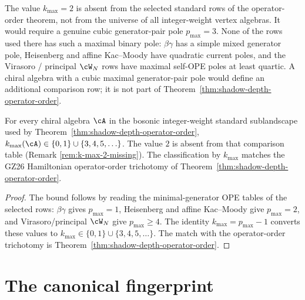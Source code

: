 \begin{remark}[Why $k_{\max} = 2$ is missing]
\label{rem:k-max-2-missing}
The value $k_{\max}=2$ is absent from the selected standard rows of
the operator-order theorem, not from the universe of all integer-weight
vertex algebras. It would require a genuine cubic generator-pair pole
$p_{\max}=3$. None of the rows used there has such a maximal binary
pole: $\beta\gamma$ has a simple mixed generator pole, Heisenberg and
affine Kac--Moody have quadratic current poles, and the Virasoro /
principal $\cW_N$ rows have maximal self-OPE poles at least quartic.
A chiral algebra with a cubic maximal generator-pair pole would define
an additional comparison row; it is not part of
Theorem~\ref{thm:shadow-depth-operator-order}.
\end{remark}

\begin{theorem}
\label{thm:k-max-trichotomy}
For every chiral algebra $\cA$ in the bosonic integer-weight standard
sublandscape used by Theorem~\textup{\ref{thm:shadow-depth-operator-order}},
$k_{\max}(\cA)\in\{0,1\}\cup\{3,4,5,\ldots\}$. The value $2$ is
absent from that comparison table \textup{(}Remark
\textup{\ref{rem:k-max-2-missing})}. The classification by
$k_{\max}$ matches the GZ\textup{26} Hamiltonian operator-order
trichotomy of
Theorem~\textup{\ref{thm:shadow-depth-operator-order}}.
\end{theorem}

\begin{proof}
The bound follows by reading the minimal-generator OPE tables of the
selected rows: $\beta\gamma$ gives $p_{\max}=1$, Heisenberg and
affine Kac--Moody give $p_{\max}=2$, and Virasoro/principal
$\cW_N$ give $p_{\max}\ge4$. The identity
$k_{\max}=p_{\max}-1$ converts these values to
$k_{\max}\in\{0,1\}\cup\{3,4,5,\ldots\}$.
The match with the operator-order trichotomy is
Theorem~\ref{thm:shadow-depth-operator-order}.
\end{proof}

\section{The canonical fingerprint}
\label{sec:canonical-fingerprint}

